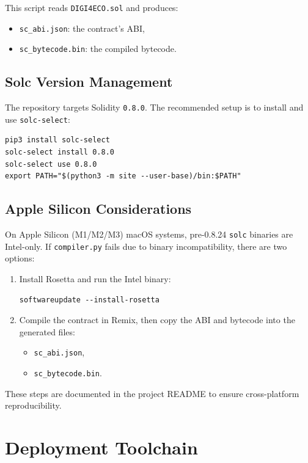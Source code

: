 \documentclass[11pt,a4paper]{article}
\begin{document}
This script reads \texttt{DIGI4ECO.sol} and produces:

\begin{itemize}[noitemsep]
  \item \texttt{sc\_abi.json}: the contract's ABI,
  \item \texttt{sc\_bytecode.bin}: the compiled bytecode.
\end{itemize}

\subsection{Solc Version Management}

The repository targets Solidity \texttt{0.8.0}. The recommended setup is to install and use \texttt{solc-select}:

\begin{lstlisting}
pip3 install solc-select
solc-select install 0.8.0
solc-select use 0.8.0
export PATH="$(python3 -m site --user-base)/bin:$PATH"
\end{lstlisting}

\subsection{Apple Silicon Considerations}

On Apple Silicon (M1/M2/M3) macOS systems, pre-0.8.24 \texttt{solc} binaries are Intel-only. If \texttt{compiler.py} fails due to binary incompatibility, there are two options:

\begin{enumerate}[noitemsep]
  \item Install Rosetta and run the Intel binary:
        \begin{lstlisting}
softwareupdate --install-rosetta
        \end{lstlisting}
  \item Compile the contract in Remix, then copy the ABI and bytecode into the generated files:
        \begin{itemize}
          \item \texttt{sc\_abi.json},
          \item \texttt{sc\_bytecode.bin}.
        \end{itemize}
\end{enumerate}

These steps are documented in the project README to ensure cross-platform reproducibility.

\section{Deployment Toolchain}
\end{document}
